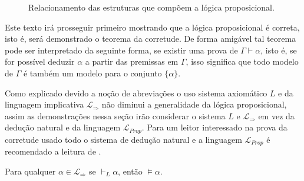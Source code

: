 \begin{figure}[ht]
    \centering
    \caption{Relacionamento das estruturas que compõem a lógica proposicional.}
    \label{fig:LogicaProposicional}
\end{figure}

Este texto irá prosseguir primeiro mostrando que a lógica proposicional é correta, isto é, será demonstrado o teorema da corretude. De forma amigável tal teorema pode ser interpretado da seguinte forma, se existir uma prova de $\Gamma \vdash \alpha$, isto é, se for possível deduzir $\alpha$ a partir das premissas em $\Gamma$, isso significa que todo modelo de $\Gamma$ é também um modelo para o conjunto $\{\alpha\}$.

\begin{rema}\label{rema:LinguagemUsada}
    Como explicado devido a noção de abreviações o uso sistema axiomático $L$ e da linguagem implicativa $\mathcal{L}_{\Rightarrow}$ não diminui a generalidade da lógica proposicional, assim as demonstrações nessa seção irão considerar o sistema $L$ e $\mathcal{L}_{\Rightarrow}$ em vez da dedução natural e da linguagem $\mathcal{L}_{Prop}$. Para um leitor interessado na prova da corretude usado todo o sistema de dedução natural e a linguagem $\mathcal{L}_{Prop}$ é recomendado a leitura de \cite{joaoPavao2014}.
\end{rema}

\begin{lema}\label{lema:Corretude}
    Para qualquer $\alpha \in \mathcal{L}_{\Rightarrow}$ se $\vdash_L \alpha$, então $\vDash \alpha$.
\end{lema}

